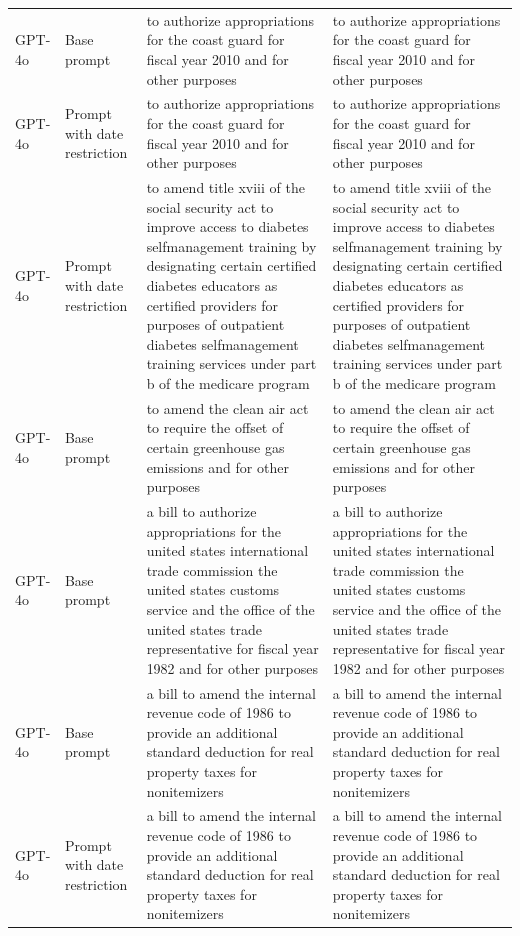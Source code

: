 \begin{longtable}{>{\raggedright\arraybackslash}p{1.4cm}>{\raggedright\arraybackslash}p{1.4cm}>{\raggedright\arraybackslash}p{5.5cm}>{\raggedright\arraybackslash}p{5.5cm}}
GPT-4o & Base prompt & to authorize appropriations for the coast guard for fiscal year 2010 and for other purposes & to authorize appropriations for the coast guard for fiscal year 2010 and for other purposes\\
GPT-4o & Prompt with date restriction & to authorize appropriations for the coast guard for fiscal year 2010 and for other purposes & to authorize appropriations for the coast guard for fiscal year 2010 and for other purposes\\
GPT-4o & Prompt with date restriction & to amend title xviii of the social security act to improve access to diabetes selfmanagement training by designating certain certified diabetes educators as certified providers for purposes of outpatient diabetes selfmanagement training services under part b of the medicare program & to amend title xviii of the social security act to improve access to diabetes selfmanagement training by designating certain certified diabetes educators as certified providers for purposes of outpatient diabetes selfmanagement training services under part b of the medicare program\\
GPT-4o & Base prompt & to amend the clean air act to require the offset of certain greenhouse gas emissions and for other purposes & to amend the clean air act to require the offset of certain greenhouse gas emissions and for other purposes\\
GPT-4o & Base prompt & a bill to authorize appropriations for the united states international trade commission the united states customs service and the office of the united states trade representative for fiscal year 1982 and for other purposes & a bill to authorize appropriations for the united states international trade commission the united states customs service and the office of the united states trade representative for fiscal year 1982 and for other purposes\\
GPT-4o & Base prompt & a bill to amend the internal revenue code of 1986 to provide an additional standard deduction for real property taxes for nonitemizers & a bill to amend the internal revenue code of 1986 to provide an additional standard deduction for real property taxes for nonitemizers\\
GPT-4o & Prompt with date restriction & a bill to amend the internal revenue code of 1986 to provide an additional standard deduction for real property taxes for nonitemizers & a bill to amend the internal revenue code of 1986 to provide an additional standard deduction for real property taxes for nonitemizers\\

\end{longtable}
